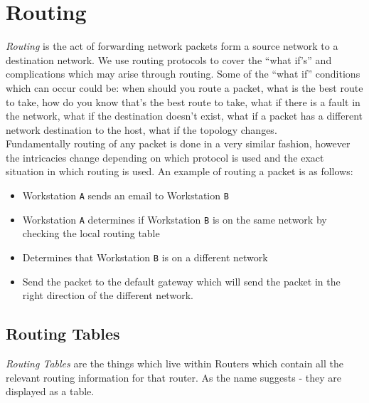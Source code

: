     
\section{Routing}
\textit{Routing} is the act of forwarding network packets form a source network to a destination network. We use routing protocols to cover the ``what if's'' and complications which may arise through routing. Some of the ``what if'' conditions which can occur could be: when should you route a packet, what is the best route to take, how do you know that's the best route to take, what if there is a fault in the network, what if the destination doesn't exist, what if a packet has a different network destination to the host, what if the topology changes.\\

Fundamentally routing of any packet is done in a very similar fashion, however the intricacies change depending on which protocol is used and the exact situation in which routing is used. An example of routing a packet is as follows:
\begin{itemize}
    \item Workstation \verb|A| sends an email to Workstation \verb|B|
    \item Workstation \verb|A| determines if Workstation \verb|B| is on the same network by checking the local routing table
    \item Determines that Workstation \verb|B| is on a different network
    \item Send the packet to the default gateway which will send the packet in the right direction of the different network. 
\end{itemize}

\subsection{Routing Tables}
\textit{Routing Tables} are the things which live within Routers which contain all the relevant routing information for that router. As the name suggests - they are displayed as a table.


